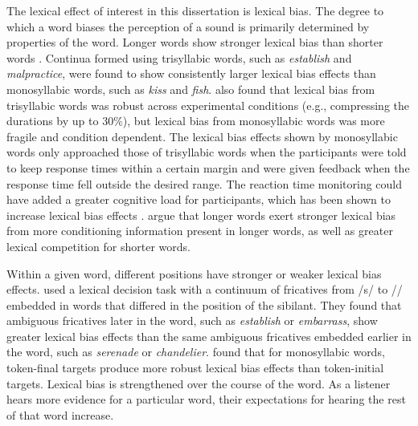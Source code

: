 The lexical effect of interest in this dissertation is lexical bias.
The degree to which a word biases the perception of a sound is primarily determined by properties of the word.
Longer words show stronger lexical bias than shorter words \citep{Pitt2006}.  
Continua formed using trisyllabic words, such as \emph{establish} and \emph{malpractice}, were found to show consistently larger lexical bias effects than monosyllabic words, such as \emph{kiss} and \emph{fish}.  
\citet{Pitt2006} also found that lexical bias from trisyllabic words was robust across experimental conditions (e.g., compressing the durations by up to 30\%), but lexical bias from monosyllabic words was more fragile and condition dependent.
The lexical bias effects shown by monosyllabic words only approached those of trisyllabic words when the participants were told to keep response times within a certain margin and were given feedback when the response time fell outside the desired range.
The reaction time monitoring could have added a greater cognitive load for participants, which has been shown to increase lexical bias effects \citep{Mattys2011}.
\citet{Pitt2006} argue that longer words exert stronger lexical bias from more conditioning information present in longer words, as well as greater lexical competition for shorter words.

Within a given word, different positions have stronger or weaker lexical bias effects.
\citet{Pitt2012} used a lexical decision task with a continuum of fricatives from /s/ to /\textesh/ embedded in words that differed in the position of the sibilant.  
They found that ambiguous fricatives later in the word, such as \emph{establish} or \emph{embarrass}, show greater lexical bias effects than the same ambiguous fricatives embedded earlier in the word, such as \emph{serenade} or \emph{chandelier}.
\citet{Pitt1993} found that for monosyllabic words, token-final targets produce more robust lexical bias effects than token-initial targets.
Lexical bias is strengthened over the course of the word.
As a listener hears more evidence for a particular word, their expectations for hearing the rest of that word increase.

